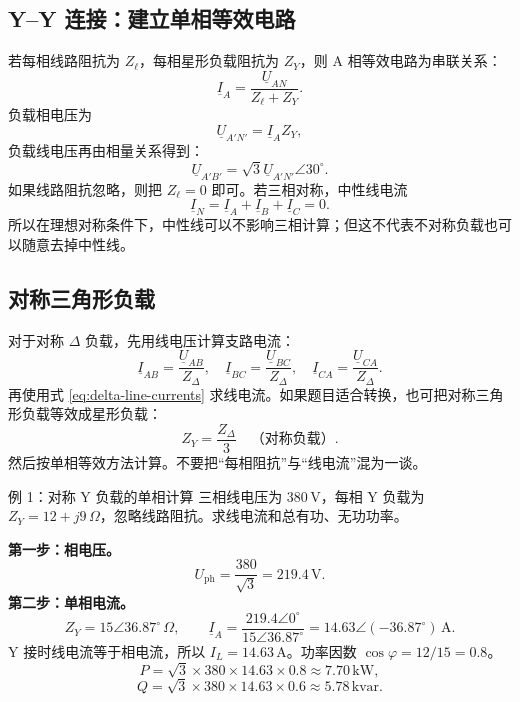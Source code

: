 \documentclass[circuit]{CarlosTexRpt}
\newcommand{\phas}[1]{\underline{#1}}
\newcommand{\dgr}{^\circ}
\begin{document}
\subsection{Y--Y 连接：建立单相等效电路}

若每相线路阻抗为 \(Z_\ell\)，每相星形负载阻抗为 \(Z_Y\)，则 A 相等效电路为串联关系：
\begin{equation}
  \boxed{\phas I_A=\frac{\phas U_{AN}}{Z_\ell+Z_Y}}.
  \label{eq:balanced-star-current}
\end{equation}
负载相电压为
\begin{equation}
  \phas U_{A'N'}=\phas I_A Z_Y,
\end{equation}
负载线电压再由相量关系得到：
\begin{equation}
  \phas U_{A'B'}=\sqrt3\phas U_{A'N'}\angle30\dgr.
\end{equation}
如果线路阻抗忽略，则把 \(Z_\ell=0\) 即可。若三相对称，中性线电流
\begin{equation}
  \phas I_N=\phas I_A+\phas I_B+\phas I_C=0.
\end{equation}
所以在理想对称条件下，中性线可以不影响三相计算；但这不代表不对称负载也可以随意去掉中性线。

\subsection{对称三角形负载}

对于对称 \(\Delta\) 负载，先用线电压计算支路电流：
\begin{equation}
  \phas I_{AB}=\frac{\phas U_{AB}}{Z_\Delta},\quad
  \phas I_{BC}=\frac{\phas U_{BC}}{Z_\Delta},\quad
  \phas I_{CA}=\frac{\phas U_{CA}}{Z_\Delta}.
\end{equation}
再使用式 \eqref{eq:delta-line-currents} 求线电流。如果题目适合转换，也可把对称三角形负载等效成星形负载：
\begin{equation}
  \boxed{Z_Y=\frac{Z_\Delta}{3}\quad\text{（对称负载）}}.
\end{equation}
然后按单相等效方法计算。不要把“每相阻抗”与“线电流”混为一谈。

\begin{examplebox}{例 1：对称 Y 负载的单相计算}
三相线电压为 \(380\,\mathrm V\)，每相 Y 负载为 \(Z_Y=12+j9\,\Omega\)，忽略线路阻抗。求线电流和总有功、无功功率。

\textbf{第一步：相电压。}
\[
  U_{\mathrm{ph}}=\frac{380}{\sqrt3}=219.4\,\mathrm V.
\]
\textbf{第二步：单相电流。}
\[
  Z_Y=15\angle36.87\dgr\,\Omega,\qquad
  \phas I_A=\frac{219.4\angle0\dgr}{15\angle36.87\dgr}
  =14.63\angle(-36.87\dgr)\,\mathrm A.
\]
Y 接时线电流等于相电流，所以 \(I_L=14.63\,\mathrm A\)。功率因数 \(\cos\varphi=12/15=0.8\)。
\[
  P=\sqrt3\times380\times14.63\times0.8\approx7.70\,\mathrm{kW},
\]
\[
  Q=\sqrt3\times380\times14.63\times0.6\approx5.78\,\mathrm{kvar}.
\]
\end{examplebox}
\end{document}

